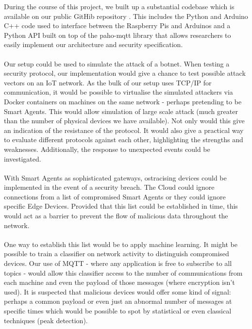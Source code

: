 During the course of this project, we built up a substantial codebase which is available on our public GitHib repository \cite{githubrepo}. This includes the Python and Arduino C++ code used to interface between the Raspberry Pis and Arduinos and a Python API built on top of the paho-mqtt library that allows researchers to easily implement our architecture and security specification.

\paragraph{}
Our setup could be used to simulate the attack of a botnet. When testing a security protocol, our implementation would give a chance to test possible attack vectors on an IoT network. As the bulk of our setup uses TCP/IP for communication, it would be possible to virtualise the simulated attackers via Docker containers on machines on the same network - perhaps pretending to be Smart Agents. This would allow simulation of large scale attack (much greater than the number of physical devices we have available). Not only would this give an indication of the resistance of the protocol. It would also give a practical way to evaluate different protocols against each other, highlighting the strengths and weaknesses. Additionally, the response to unexpected events could be investigated.

\paragraph{}
With Smart Agents as sophisticated gateways, ostracising devices could be implemented in the event of a security breach. The Cloud could ignore connections from a list of compromised Smart Agents or they could ignore specific Edge Devices. Provided that this list could be established in time, this would act as a barrier to prevent the flow of malicious data throughout the network.

\paragraph{}
One way to establish this list would be to apply machine learning. It might be possible to train a classifier on network activity to distinguish compromised devices. Our use of MQTT - where any application is free to subscribe to all topics - would allow this classifier access to the number of communications from each machine and even the payload of those messages (where encryption isn't used). It is suspected that malicious devices would offer some kind of signal: perhaps a common payload or even just an abnormal number of messages at specific times which would be possible to spot by statistical or even classical techniques (peak detection).
